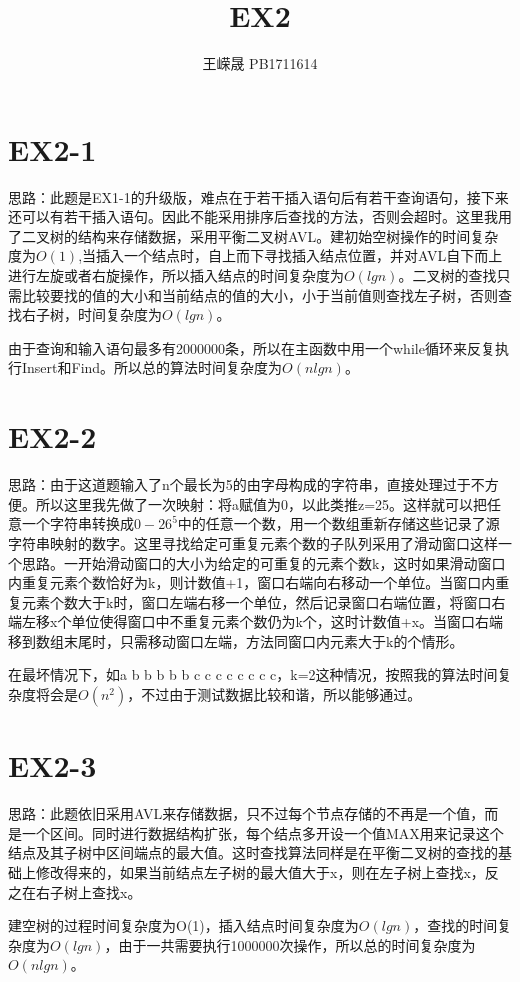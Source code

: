 \documentclass[UTF8, 11pt]{ctexart}
\title{EX2}
\author{王嵘晟 \quad PB1711614}
\date{}
\begin{document}
	\maketitle
	\section*{EX2-1}
	\par{思路：此题是EX1-1的升级版，难点在于若干插入语句后有若干查询语句，接下来还可以有若干插入语句。因此不能采用排序后查找的方法，否则会超时。这里我用了二叉树的结构来存储数据，采用平衡二叉树AVL。建初始空树操作的时间复杂度为$O(1)$,当插入一个结点时，自上而下寻找插入结点位置，并对AVL自下而上进行左旋或者右旋操作，所以插入结点的时间复杂度为$O(lgn)$。二叉树的查找只需比较要找的值的大小和当前结点的值的大小，小于当前值则查找左子树，否则查找右子树，时间复杂度为$O(lgn)$。}
	\par{由于查询和输入语句最多有2000000条，所以在主函数中用一个while循环来反复执行Insert和Find。所以总的算法时间复杂度为$O(nlgn)$。}
	\section*{EX2-2}
	\par{思路：由于这道题输入了n个最长为5的由字母构成的字符串，直接处理过于不方便。所以这里我先做了一次映射：将a赋值为0，以此类推z=25。这样就可以把任意一个字符串转换成$0-26^{5}$中的任意一个数，用一个数组重新存储这些记录了源字符串映射的数字。这里寻找给定可重复元素个数的子队列采用了滑动窗口这样一个思路。一开始滑动窗口的大小为给定的可重复的元素个数k，这时如果滑动窗口内重复元素个数恰好为k，则计数值+1，窗口右端向右移动一个单位。当窗口内重复元素个数大于k时，窗口左端右移一个单位，然后记录窗口右端位置，将窗口右端左移x个单位使得窗口中不重复元素个数仍为k个，这时计数值+x。当窗口右端移到数组末尾时，只需移动窗口左端，方法同窗口内元素大于k的个情形。}
	\par{在最坏情况下，如a b b b b b c c c c c c c c，k=2这种情况，按照我的算法时间复杂度将会是$O(n^{2})$，不过由于测试数据比较和谐，所以能够通过。}
	\section*{EX2-3}
	\par{思路：此题依旧采用AVL来存储数据，只不过每个节点存储的不再是一个值，而是一个区间。同时进行数据结构扩张，每个结点多开设一个值MAX用来记录这个结点及其子树中区间端点的最大值。这时查找算法同样是在平衡二叉树的查找的基础上修改得来的，如果当前结点左子树的最大值大于x，则在左子树上查找x，反之在右子树上查找x。}
	\par{建空树的过程时间复杂度为O(1)，插入结点时间复杂度为$O(lgn)$，查找的时间复杂度为$O(lgn)$，由于一共需要执行1000000次操作，所以总的时间复杂度为$O(nlgn)$。}
\end{document}
